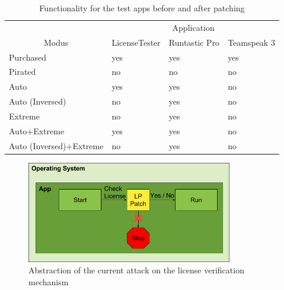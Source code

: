\begin{table}[h]
\centering
\begin{tabular}{llll}
                                             & \multicolumn{3}{c}{Application}             \\
\multicolumn{1}{c|}{Modus}                   & LicenseTester & Runtastic Pro & Teamspeak 3 \\ \hline
\multicolumn{1}{l|}{Purchased}               & yes           & yes           & yes         \\
\multicolumn{1}{l|}{Pirated}                 & no            & no            & no          \\
\multicolumn{1}{l|}{Auto}                    & yes           & yes           & no          \\
\multicolumn{1}{l|}{Auto (Inversed)}         & no            & yes           & no          \\
\multicolumn{1}{l|}{Extreme}                 & no            & yes           & no          \\
\multicolumn{1}{l|}{Auto+Extreme}            & yes           & yes           & no          \\
\multicolumn{1}{l|}{Auto (Inversed)+Extreme} & no            & yes           & no
\end{tabular}
\caption{Functionality for the test apps before and after patching}
\label{table:functionality}
\end{table}

\begin{figure}[h]
    \centering
    \includegraphics[width=0.8\textwidth]{data/verificationNowAttack.png}
    \caption{Abstraction of the current attack on the license verification mechanism}
    \label{fig:verificationNowAttack}
\end{figure}
